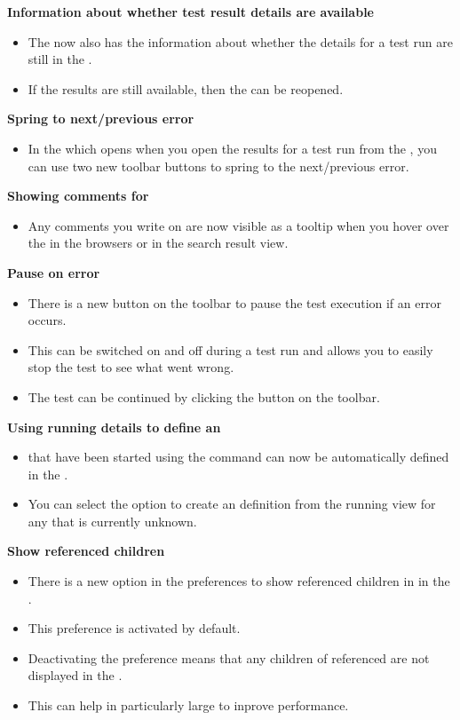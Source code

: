 \textbf{Information about whether test result details are available}
\begin{itemize}
\item The \gdtestsummaryview{} now also has the information about whether the details for a test run are still in the \gddb{}.
\item If the results are still available, then the \gdtestresultview{} can be reopened.
\end{itemize}

\textbf{Spring to next/previous error}
\begin{itemize}
\item In the \gdtestresultview{} which opens when you open the results for a test run from the \gdtestsummaryview{}, you can use two new toolbar buttons to spring to the next/previous error.
\end{itemize}

\textbf{Showing comments for \gdcases{}}
\begin{itemize}
\item Any comments you write on \gdcases{} are now visible as a tooltip when you hover over the \gdcase{} in the browsers or in the search result view.
\end{itemize}

\textbf{Pause on error}
\begin{itemize}
\item There is a new button on the toolbar to pause the test execution if an error occurs.
\item This can be switched on and off during a test run and allows you to easily stop the test to see what went wrong.
\item The test can be continued by clicking the  button on the toolbar.
\end{itemize}

\textbf{Using running \gdaut{} details to define an \gdaut{}}
\begin{itemize}
\item \gdauts{} that have been started using the  command can now be automatically defined in the \ite{}.
\item You can select the option to create an \gdaut{} definition from the running \gdauts{} view for any \gdaut{} that is currently unknown.
\end{itemize}

\textbf{Show referenced children}
\begin{itemize}
\item There is a new option in the preferences to show referenced children in \gdcases{} in the \gdtestcasebrowser{}.
\item This preference is activated by default. 
\item Deactivating the preference means that any children of referenced \gdcases{} are not displayed in the \gdtestcasebrowser{}. 
\item This can help in particularly large \gdprojects{} to inprove performance.
\end{itemize}


